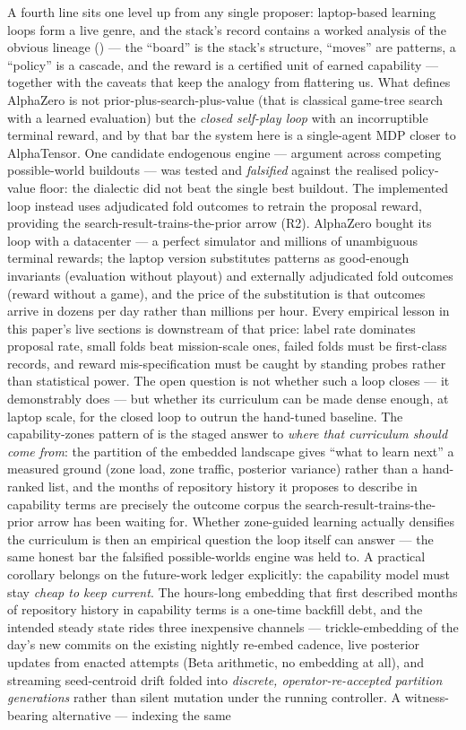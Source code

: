 A fourth line sits one level up from any single proposer: laptop-based learning loops form a live genre, and the stack's record contains a worked analysis of the obvious lineage () --- the ``board'' is the stack's structure, ``moves'' are patterns, a ``policy'' is a cascade, and the reward is a certified unit of earned capability --- together with the caveats that keep the analogy from flattering us.  What defines AlphaZero is not prior-plus-search-plus-value (that is classical game-tree search with a learned evaluation) but the \emph{closed self-play loop} with an incorruptible terminal reward, and by that bar the system here is a single-agent MDP closer to AlphaTensor. One candidate endogenous engine --- argument across competing possible-world buildouts --- was tested and \emph{falsified} against the realised policy-value floor: the dialectic did not beat the single best buildout. The implemented loop instead uses adjudicated fold outcomes to retrain the proposal reward, providing the search-result-trains-the-prior arrow (R2).  AlphaZero bought its loop with a datacenter --- a perfect simulator and millions of unambiguous terminal rewards; the laptop version substitutes patterns as good-enough invariants (evaluation without playout) and externally adjudicated fold outcomes (reward without a game), and the price of the substitution is that outcomes arrive in dozens per day rather than millions per hour.  Every empirical lesson in this paper's live sections is downstream of that price: label rate dominates proposal rate, small folds beat mission-scale ones, failed folds must be first-class records, and reward mis-specification must be caught by standing probes rather than statistical power.  The open question is not whether such a loop closes --- it demonstrably does --- but whether its curriculum can be made dense enough, at laptop scale, for the closed loop to outrun the hand-tuned baseline.  The capability-zones pattern of \xcatalog{} is the staged answer to \emph{where that curriculum should come from}: the partition of the embedded landscape gives ``what to learn next'' a measured ground (zone load, zone traffic, posterior variance) rather than a hand-ranked list, and the months of repository history it proposes to describe in capability terms are precisely the outcome corpus the search-result-trains-the-prior arrow has been waiting for.  Whether zone-guided learning actually densifies the curriculum is then an empirical question the loop itself can answer --- the same honest bar the falsified possible-worlds engine was held to.  A practical corollary belongs on the future-work ledger explicitly: the capability model must stay \emph{cheap to keep current}.  The hours-long embedding that first described months of repository history in capability terms is a one-time backfill debt, and the intended steady state rides three inexpensive channels --- trickle-embedding of the day's new commits on the existing nightly re-embed cadence, live posterior updates from enacted attempts (Beta arithmetic, no embedding at all), and streaming seed-centroid drift folded into \emph{discrete, operator-re-accepted partition generations} rather than silent mutation under the running controller.  A witness-bearing alternative --- indexing the same 
